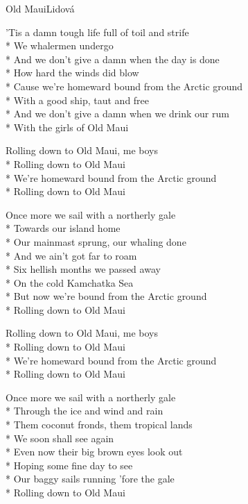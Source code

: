 \documentclass[10.5pt]{book}
\begin{document}
\begin{poem}{Old Maui}{Lidová}

\settowidth{\versewidth}{Cause we're homeward bound from the Arctic ground}

'Tis a damn tough life full of toil and strife\\*
We whalermen undergo\\*
And we don't give a damn when the day is done\\*
How hard the winds did blow\\*
Cause we're homeward bound from the Arctic ground\\*
With a good ship, taut and free\\*
And we don't give a damn when we drink our rum\\*
With the girls of Old Maui

Rolling down to Old Maui, me boys\\*
Rolling down to Old Maui\\*
We're homeward bound from the Arctic ground\\*
Rolling down to Old Maui

Once more we sail with a northerly gale\\*
Towards our island home\\*
Our mainmast sprung, our whaling done\\*
And we ain't got far to roam\\*
Six hellish months we passed away\\*
On the cold Kamchatka Sea\\*
But now we're bound from the Arctic ground\\*
Rolling down to Old Maui

Rolling down to Old Maui, me boys\\*
Rolling down to Old Maui\\*
We're homeward bound from the Arctic ground\\*
Rolling down to Old Maui

Once more we sail with a northerly gale\\*
Through the ice and wind and rain\\*
Them coconut fronds, them tropical lands\\*
We soon shall see again\\*
Even now their big brown eyes look out\\*
Hoping some fine day to see\\*
Our baggy sails running 'fore the gale\\*
Rolling down to Old Maui


\end{poem}
\end{document}
